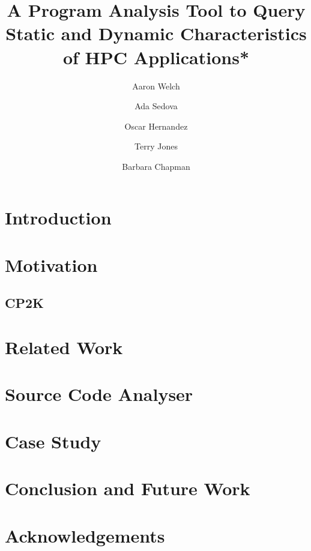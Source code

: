 \documentclass[letterpaper, 10 pt, conference]{IEEEtran}
\begin{document}
\title{\LARGE \bf
A Program Analysis Tool to Query Static and Dynamic Characteristics of HPC Applications*
}
\author[1, 2]{Aaron Welch}
\author[1]{Ada Sedova}
\author[1]{Oscar Hernandez}
\author[1]{Terry Jones}
\author[2]{Barbara Chapman}

\maketitle
\begin{abstract}

\end{abstract}
\section{Introduction}
\label{sec:intro}

\section{Motivation}
\label{sec:motivation}

\subsection{CP2K}
\label{sec:cp2k}

\section{Related Work}
\label{sec:related}

\section{Source Code Analyser}
\label{sec:analysis}

\section{Case Study}
\label{sec:casestudy}

\section{Conclusion and Future Work}
\label{sec:conclusion}

\section*{Acknowledgements}
\label{sec:ack}



\end{document}
